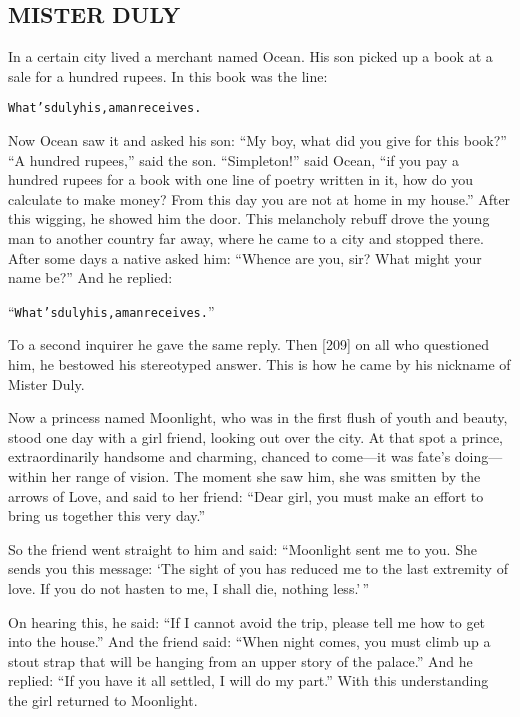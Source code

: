 \documentclass{article}
\renewenvironment{verbatim}{\begin{alltt}\normalfont\begin{centering}}{\end{centering}\end{alltt}}
\begin{document}
\subsection{MISTER DULY}

In a certain city lived a merchant named Ocean. His son picked up a
book at a sale for a hundred rupees. In this book was the line:

\begin{verbatim}
What's duly his, a man receives.
\end{verbatim}
Now Ocean saw it and asked his son:
``My boy, what did you give for this book?'' ``A hundred rupees,''
said the son. ``Simpleton!'' said Ocean,
``if you pay a hundred rupees for a book with one line of poetry written in it, how do you calculate to make money? From this day you are not at home in my house.''
After this wigging, he showed him the door. This melancholy rebuff
drove the young man to another country far away, where he came to a
city and stopped there. After some days a native asked him:
``Whence are you, sir? What might your name be?'' And he replied:

\begin{verbatim}
“What's duly his, a man receives.”
\end{verbatim}
To a second inquirer he gave the same reply. Then [209] on all who
questioned him, he bestowed his stereotyped answer. This is how he
came by his nickname of Mister Duly.

Now a princess named Moonlight, who was in the first flush of youth
and beauty, stood one day with a girl friend, looking out over the
city. At that spot a prince, extraordinarily handsome and charming,
chanced to come---it was fate's doing---within her range of vision.
The moment she saw him, she was smitten by the arrows of Love, and
said to her friend:
``Dear girl, you must make an effort to bring us together this very day.''

So the friend went straight to him and said:
``Moonlight sent me to you. She sends you this message: `The sight of you has reduced me to the last extremity of love. If you do not hasten to me, I shall die, nothing less.'\,''

On hearing this, he said:
``If I cannot avoid the trip, please tell me how to get into the house.''
And the friend said:
``When night comes, you must climb up a stout strap that will be hanging from an upper story of the palace.''
And he replied: ``If you have it all settled, I will do my part.''
With this understanding the girl returned to Moonlight.
\end{document}

